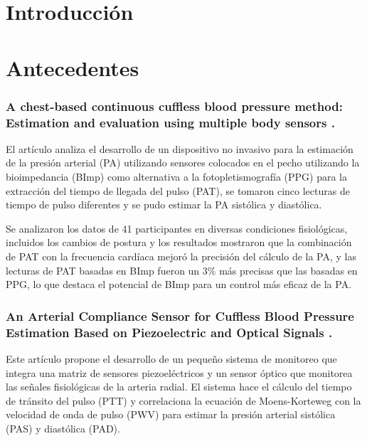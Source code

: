 \setcounter{page}{1} %

\section{Introducción}


\section{Antecedentes}

    \subsubsection*{A chest-based continuous cuffless blood pressure method: Estimation and evaluation using multiple body sensors \cite{bodySensor}.}

    El artículo analiza el desarrollo de un dispositivo no invasivo para la estimación de la presión arterial (PA) utilizando sensores colocados en el pecho utilizando la bioimpedancia (BImp) como alternativa a la fotopletismografía (PPG) para la extracción del tiempo de llegada del pulso (PAT), se tomaron cinco lecturas de tiempo de pulso diferentes y se pudo estimar la PA sistólica y diastólica. 
    
    Se analizaron los datos de 41 participantes en diversas condiciones fisiológicas, incluidos los cambios de postura y los resultados mostraron que la combinación de PAT con la frecuencia cardíaca 
    mejoró la precisión del cálculo de la PA, y las lecturas de PAT basadas en BImp fueron un 3\% más precisas que las basadas en PPG, lo que destaca el potencial de BImp para un control más eficaz de la PA.

    \subsubsection*{An Arterial Compliance Sensor for Cuffless Blood Pressure Estimation Based on Piezoelectric and Optical Signals \cite{piezoelectric}.}

    Este artículo propone el desarrollo de un pequeño sistema de monitoreo que integra una matriz de sensores piezoeléctricos y un sensor óptico que monitorea las señales fisiológicas de la arteria radial. El sistema hace el cálculo del tiempo de tránsito del pulso (PTT) y correlaciona la ecuación de Moens-Korteweg con la velocidad de onda de pulso (PWV) para estimar la presión arterial sistólica (PAS) y diastólica (PAD).

